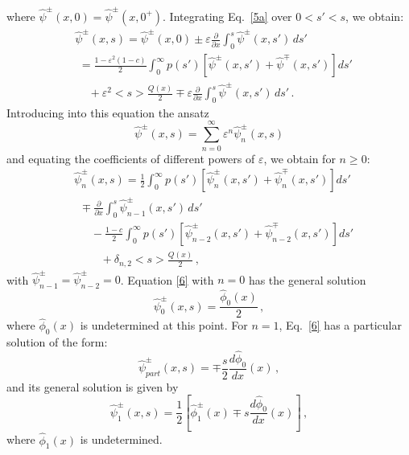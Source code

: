 \documentclass{anstrans}
\newcommand{\bl}{\big<}
\newcommand{\bg}{\big>}
\newcommand{\eps}{\varepsilon}
\begin{document}
where $\hat\psi^\pm(x,0) = \hat\psi^\pm(x,0^+)$. Integrating Eq.\ \eqref{5a} over $0 < s' < s$, we obtain:
   \begin{align}
      &\hat\psi^\pm( x, s)  = \hat\psi^\pm(x, 0) \pm \varepsilon \frac{\partial}{\partial x} \int_0^s \hat\psi^\pm(x, s') \, ds' \nonumber\\
      & \,\, = \frac{1-\eps^2(1-c)}{2} \int_0^{\infty} p(s')
\left[\hat\psi^\pm(x,s')+\hat\psi^\mp(x, s')\right] ds'  \nonumber\\
         &\,\,\,\,\,\,\, + \varepsilon^2 \bl s\bg \frac{Q(x)}{2} \mp \varepsilon\frac{\partial}{\partial x} \int_0^s \hat\psi^\pm(x, s') \, ds' \,.\nonumber
   \end{align}
Introducing into this equation the ansatz 
   \begin{equation}
 \hat\psi^\pm(x, s) =  \sum_{n=0}^{\infty} \varepsilon^n
       \hat\psi_n^\pm(x, s) \nonumber
       \end{equation}
and equating the coefficients of different powers of $\varepsilon$, we obtain for $n \ge 0$:
   \begin{align}
&      \hat\psi_n^\pm(x, s)  = \frac{1}{2}\int_0^{\infty} p(s')\left[
\hat\psi_n^\pm(x, s')+\hat\psi_n^\mp(x,s')\right] ds' \label{6}\\
&\,\,\, \mp \frac{\partial}{\partial x} \int_0^s \hat\psi_{n-1}^\pm(x, s') \, ds' \nonumber \\
& \,\,\,\,\,\,\,\,\, -\frac{1-c}{2}\int_0^{\infty} p(s')\left[
\hat\psi_{n-2}^\pm(x, s')+\hat\psi_{n-2}^\mp(x,s')\right] ds'  \nonumber\\   
      & \,\,\,\,\,\,\,\,\,\,\,\,\,\,+ \delta_{n,2} \bl s\bg \frac{Q( x)}{2} \,, 
   \nonumber
   \end{align}
with $\hat\psi_{n-1}^\pm=\hat\psi_{n-2}^\pm=0$.
 Equation \eqref{6} with $n=0$ has the general solution
   \begin{equation}
      \hat\psi_0^\pm(x, s) = \frac{\hat\phi_0(x)}{2} \,, \nonumber
   \end{equation}
where $\hat\phi_0(x)$ is undetermined at this point. For $n=1$,
Eq.\ \eqref{6} has a particular solution of the form:
    \begin{equation}
      \hat\psi_{part}^\pm(x,s) = \mp \frac{s}{2}\frac{d \hat\phi_0}{d x}(x) \,,\nonumber
   \end{equation}   
and its general solution is given by 
   \begin{equation}
      \hat\psi_1^\pm( x, s) =  \frac{1}{2}\left[\hat\phi_1^\pm( x) \mp s\frac{d \hat\phi_0}{d x}(x)\right] \,,\nonumber
   \label{eq17}
  \end{equation}  
where $\hat\phi_1(x)$ is undetermined.
\end{document}

